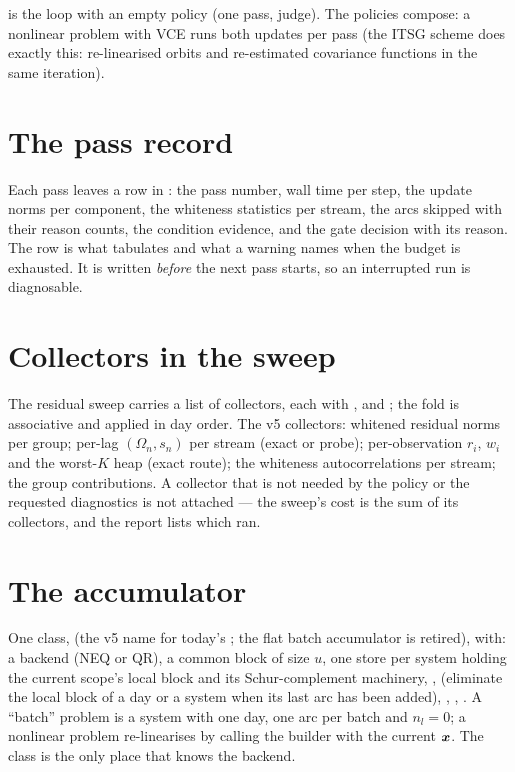  is the loop with an empty policy (one pass, judge). The policies compose: a nonlinear problem with VCE runs both updates per pass (the ITSG scheme does exactly this: re-linearised orbits and re-estimated covariance functions in the same iteration).

\section{The pass record}

Each pass leaves a row in : the pass number, wall time per step, the update norms per component, the whiteness statistics per stream, the arcs skipped with their reason counts, the condition evidence, and the gate decision with its reason. The row is what  tabulates and what a warning names when the budget is exhausted. It is written \emph{before} the next pass starts, so an interrupted run is diagnosable.

\section{Collectors in the sweep}

The residual sweep carries a list of collectors, each with ,  and ; the fold is associative and applied in day order. The v5 collectors: whitened residual norms per group; per-lag $(\Omega_n, s_n)$ per stream (exact or probe); per-observation $r_i$, $w_i$ and the worst-$K$ heap (exact route); the whiteness autocorrelations per stream; the group contributions. A collector that is not needed by the policy or the requested diagnostics is not attached --- the sweep's cost is the sum of its collectors, and the report lists which ran.

\section{The accumulator}

One class,  (the v5 name for today's ; the flat batch accumulator is retired), with: a backend (NEQ or QR), a common block of size $u$, one store per system holding the current scope's local block and its Schur-complement machinery, ,  (eliminate the local block of a day or a system when its last arc has been added), , , . A ``batch'' problem is a system with one day, one arc per batch and $n_l = 0$; a nonlinear problem re-linearises by calling the builder with the current $\bm{x}$. The class is the only place that knows the backend.

